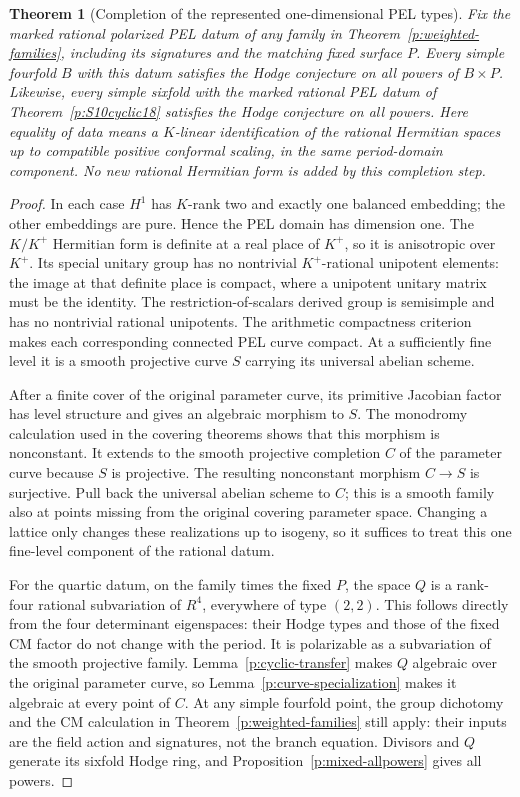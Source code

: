 \documentclass[10pt,reqno]{article}
\theoremstyle{emphasizedplain}
\newtheorem{theorem}{Theorem}[section]
\theoremstyle{emphasizeddefinition}
\theoremstyle{emphasizeddefinition}
\begin{document}
\begin{theorem}[Completion of the represented one-dimensional PEL types]
\label{p:PELcompletion}
Fix the marked rational polarized PEL datum of any family in
Theorem~\ref{p:weighted-families}, including its signatures and the
matching fixed surface $P$. Every simple fourfold $B$ with this datum
satisfies the Hodge conjecture on all powers of $B\times P$.
Likewise, every simple sixfold with the marked rational PEL datum of
Theorem~\ref{p:S10cyclic18} satisfies the Hodge conjecture on all powers.
Here equality of data means a $K$-linear identification of the rational
Hermitian spaces up to compatible positive conformal scaling, in the
same period-domain component. No new rational Hermitian form is added
by this completion step.
\end{theorem}
\begin{proof}
In each case $H^1$ has $K$-rank two and exactly one balanced embedding;
the other embeddings are pure. Hence the PEL domain has dimension one.
The $K/K^+$ Hermitian form is definite at a real place of $K^+$, so
it is anisotropic over $K^+$. Its special unitary group has no nontrivial
$K^+$-rational unipotent elements: the image at that definite place is
compact, where a unipotent unitary matrix must be the identity.
The restriction-of-scalars derived group is semisimple and has no
nontrivial rational unipotents. The arithmetic compactness criterion
\cite[Theorem 3.3(b)]{MilneShimura} makes each corresponding connected
PEL curve compact. At a sufficiently fine level it is a smooth
projective curve $S$ carrying its universal abelian scheme.

After a finite cover of the original parameter curve, its primitive
Jacobian factor has level structure and gives an algebraic morphism
to $S$. The monodromy calculation used in the covering theorems shows
that this morphism is nonconstant. It extends to the smooth projective
completion $C$ of the parameter curve because $S$ is projective.
The resulting nonconstant morphism $C\to S$ is surjective. Pull back
the universal abelian scheme to $C$; this is a smooth family also at
points missing from the original covering parameter space.
Changing a lattice only changes these realizations up to isogeny,
so it suffices to treat this one fine-level component of the rational
datum.

For the quartic datum, on the family times the fixed $P$, the space
$Q$ is a rank-four rational subvariation of $R^4$, everywhere of type
$(2,2)$. This follows directly from the four determinant eigenspaces:
their Hodge types and those of the fixed CM factor do not change with
the period. It is polarizable as a subvariation of the smooth projective
family. Lemma~\ref{p:cyclic-transfer} makes $Q$ algebraic over the
original parameter curve, so Lemma~\ref{p:curve-specialization} makes
it algebraic at every point of $C$. At any simple fourfold point,
the group dichotomy and the CM calculation in
Theorem~\ref{p:weighted-families} still apply: their inputs are the
field action and signatures, not the branch equation. Divisors and
$Q$ generate its sixfold Hodge ring, and
Proposition~\ref{p:mixed-allpowers} gives all powers.


\end{proof}
\end{document}
